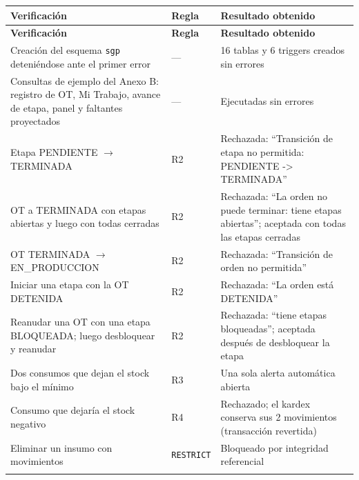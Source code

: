 \documentclass[11pt,a4paper]{article}
\begin{document}
\begingroup
\begin{longtable}{@{}>{\raggedright\arraybackslash\hspace{0pt}}p{}>{\raggedright\arraybackslash\hspace{0pt}}p{}>{\raggedright\arraybackslash\hspace{0pt}}p{}@{}}
\toprule
\textbf{Verificación} & \textbf{Regla} & \textbf{Resultado obtenido} \\ \midrule
\endfirsthead
\toprule
\textbf{Verificación} & \textbf{Regla} & \textbf{Resultado obtenido} \\ \midrule
\endhead
\bottomrule
\endlastfoot
Creación del esquema \texttt{sgp} deteniéndose ante el primer error & \mbox{---} & 16 tablas y 6 triggers creados sin errores \\ \addlinespace[0.25em]
Consultas de ejemplo del Anexo B: registro de OT, Mi Trabajo, avance de etapa, panel y faltantes proyectados & \mbox{---} & Ejecutadas sin errores \\ \addlinespace[0.25em]
Etapa PENDIENTE \ensuremath{\rightarrow}\allowbreak{} TERMINADA & \mbox{R2} & Rechazada: ``Transición de etapa no permitida: PENDIENTE -> TERMINADA'' \\ \addlinespace[0.25em]
OT a TERMINADA con etapas abiertas y luego con todas cerradas & \mbox{R2} & Rechazada: ``La orden no puede terminar: tiene etapas abiertas''; aceptada con todas las etapas cerradas \\ \addlinespace[0.25em]
OT TERMINADA \ensuremath{\rightarrow}\allowbreak{} EN\_PRODUCCION & \mbox{R2} & Rechazada: ``Transición de orden no permitida'' \\ \addlinespace[0.25em]
Iniciar una etapa con la OT DETENIDA & \mbox{R2} & Rechazada: ``La orden está DETENIDA'' \\ \addlinespace[0.25em]
Reanudar una OT con una etapa BLOQUEADA; luego desbloquear y reanudar & \mbox{R2} & Rechazada: ``tiene etapas bloqueadas''; aceptada después de desbloquear la etapa \\ \addlinespace[0.25em]
Dos consumos que dejan el stock bajo el mínimo & \mbox{R3} & Una sola alerta automática abierta \\ \addlinespace[0.25em]
Consumo que dejaría el stock negativo & \mbox{R4} & Rechazado; el kardex conserva sus 2 movimientos (transacción revertida) \\ \addlinespace[0.25em]
Eliminar un insumo con movimientos & \texttt{RESTRICT} & Bloqueado por integridad referencial \\ \addlinespace[0.25em]

\end{longtable}
\end{document}
